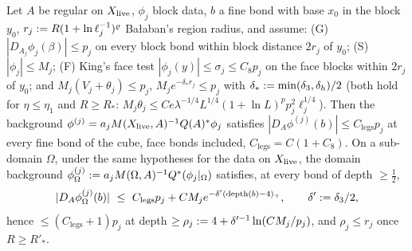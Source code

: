 \begin{proposition}\label{prop:a01:legsd}
Let $A$ be regular on $X_{\mathrm{live}}$, $\phi_j$ block data, $b$ a fine bond with base $x_0$ in the block $y_0$, $r_j:= R(1+\ln\ell_j^{-1})^{\varrho}$ Ba{\l}aban's region radius, and assume: (G) $|D_{A_j}\phi_j(\beta)|\le p_j$ on every block bond within block distance $2r_j$ of $y_0$; (S) $|\phi_j|\le M_j$; (F) King's face test $|\phi_j(y)|\le\sigma_j\le C_8p_j$ on the face blocks within $2r_j$ of $y_0$; and $M_j(V_j+\theta_j)\le p_j$, $M_je^{-\delta_*r_j}\le p_j$ with $\delta_*:=\min(\delta_3,\delta_h)/2$ (both hold for $\eta\le\eta_1$ and $R\ge R_*$: $M_j\theta_j\le Ce\lambda^{-1/4}L^{1/4}(1+\ln L)^pp_j^2\ell_j^{1/4}$). Then the background $\phi^{(j)}=a_jM(X_{\mathrm{live}},A)^{-1}Q(A)^*\phi_j$ satisfies $|D_A\phi^{(j)}(b)|\le C_{\mathrm{legs}}p_j$ at every fine bond of the cube, face bonds included, $C_{\mathrm{legs}}=C(1+C_8)$. On a sub-domain $\Omega$, under the same hypotheses for the data on $X_{\mathrm{live}}$, the domain background $\phi^{(j)}_\Omega:= a_jM(\Omega,A)^{-1}Q^*(\phi_j|_\Omega)$ satisfies, at every bond of depth $\ge\frac12$,
\[
|D_A\phi^{(j)}_\Omega(b)|\ \le\ C_{\mathrm{legs}}p_j+CM_je^{-\delta'(\dep(b)-4)_+},\qquad\delta'\defeq\delta_3/2,
\]
hence $\le(C_{\mathrm{legs}}+1)p_j$ at depth $\ge\rho_j:=4+\delta'^{-1}\ln(CM_j/p_j)$, and $\rho_j\le r_j$ once $R\ge R'_*$.
\end{proposition}
